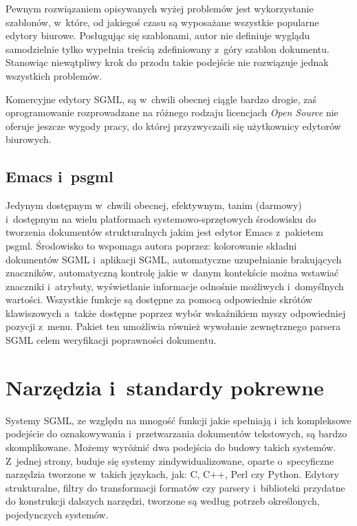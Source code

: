 \documentclass[brudnopis]{xmgr}
\begin{document}
Pewnym rozwiązaniem opisywanych wyżej problemów jest wykorzystanie
szablonów, w~które, od jakiegoś czasu są wyposażane wszystkie
popularne edytory biurowe.  Posługując się
szablonami, autor nie definiuje wyglądu samodzielnie tylko wypełnia
treścią zdefiniowany z~góry szablon dokumentu.  
Stanowiąc niewątpliwy
krok do przodu takie podejście nie rozwiązuje jednak wszystkich
problemów.

Komercyjne edytory SGML, są w~chwili obecnej ciągle bardzo
drogie, zaś oprogramowanie rozprowadzane na różnego rodzaju licencjach
\emph{Open Source\/} nie oferuje jeszcze wygody pracy, do której
przyzwyczaili się użytkownicy edytorów biurowych.  

\section{Emacs i~psgml}

Jedynym dostępnym w~chwili
obecnej, efektywnym, tanim (darmowy) i~dostępnym na wielu
platformach systemowo-sprzętowych środowisku do tworzenia dokumentów
strukturalnych jakim jest edytor Emacs z~pakietem
psgml. Środowisko to wspomaga autora poprzez:
kolorowanie składni dokumentów SGML i~aplikacji SGML, automatyczne
uzupełnianie brakujących znaczników, automatyczną kontrolę jakie
w~danym kontekście można wstawiać znaczniki i~atrybuty, wyświetlanie
informacje odnośnie możliwych i~domyślnych wartości. 
Wszystkie funkcje są dostępne za pomocą
odpowiednie skrótów klawiszowych a~także dostępne poprzez wybór
wskaźnikiem myszy odpowiedniej pozycji z~menu. Pakiet ten umożliwia
również wywołanie zewnętrznego parsera SGML celem
weryfikacji poprawności dokumentu.
      
\chapter{Narzędzia i~standardy pokrewne}

Systemy SGML, ze względu na mnogość funkcji jakie spełniają i~ich
kompleksowe podejście do oznakowywania i~przetwarzania dokumentów
tekstowych, są bardzo skomplikowane. Możemy wyróżnić dwa podejścia do
budowy takich systemów.  Z~jednej strony, buduje się systemy
zindywidualizowane, oparte o~specyficzne narzędzia tworzone w~takich
językach, jak: C, C++, Perl czy Python. Edytory strukturalne, filtry
do transformacji formatów czy parsery i~biblioteki
przydatne do konstrukcji dalszych narzędzi, tworzone są według potrzeb
określonych, pojedynczych systemów.
    
\end{document}
